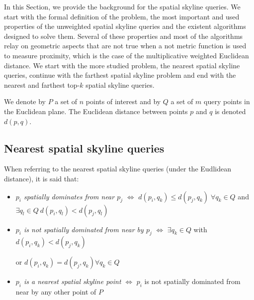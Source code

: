 \documentclass[11pt,onecolumn]{elsart3p}
\begin{document}
In this Section, we provide the background for the spatial skyline queries. We start with the formal definition of the problem, the most important and used properties of the unweighted spatial skyline queries and the existent algorithms designed to solve them. Several of these properties and most of the algorithms relay on geometric aspects that are not true when a not metric function is used to measure proximity, which is the case of the multiplicative weighted Euclidean distance. %
We start with the more studied problem, the nearest spatial skyline queries, continue with the farthest spatial skyline problem and end with the nearest and farthest top-$k$ spatial skyline queries.

\vspace{1em}
We denote by $P$ a set of $n$ points of interest and by $Q$ a set of $m$ query points in the Euclidean plane. The Euclidean distance between points $p$ and $q$ is denoted $d(p,q)$.

\subsection{Nearest spatial skyline queries}

When referring to the nearest spatial skyline queries (under the Eudlidean distance), it is said that:

\vspace{0.6em}
 \begin{itemize}
  \item {\it $p_i$ spatially dominates from near $p_j$} $\iff$ $d(p_i, q_k) \le d(p_j, q_k) \; \forall q_k\in Q$ and $\exists q_l\in Q \ d(p_i, q_l) < d(p_j, q_l)$ \vspace{0.6em}%
  \item {\it $p_i$ is not spatially dominated from near by $p_j$} $\iff$ $\exists q_k\in Q$ with $d(p_i, q_k) < d(p_j, q_k)$
            \begin{flushright}
                 {or $d(p_i, q_k) = d(p_j, q_k) \forall q_k \in Q$ \hspace{0.2\linewidth }\vspace{0.6em}}
                   \end{flushright}%
  \item {\it $p_i$ is a nearest spatial skyline point} $\iff$ $p_i$ is not spatially dominated from near by any other point of $P$\vspace{0.6em}
 \end{itemize}
\end{document}
